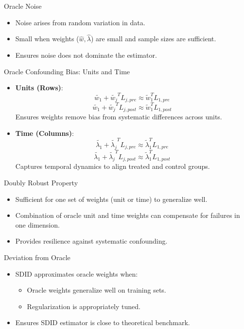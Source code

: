 \documentclass{beamer}
\begin{document}
\begin{frame}{Oracle Noise}
\begin{itemize}
\item Noise arises from random variation in data.
\item Small when weights (\(\hat{w}, \hat{\lambda}\)) are small and sample sizes are sufficient.
\item Ensures noise does not dominate the estimator.
\end{itemize}
\end{frame}

\begin{frame}{Oracle Confounding Bias: Units and Time}
\begin{itemize}
\item \textbf{Units (Rows)}:
    \[
    \widetilde{w_1} + \widetilde{w_{j}}^TL_{j,pre} \approx \widetilde{w}_1^TL_{1,pre}
    \]
    \[
    \widetilde{w_1} + \widetilde{w_{j}}^TL_{j,post} \approx \widetilde{w}_1^TL_{1,post}
    \]
    Ensures weights remove bias from systematic differences across units.
\item \textbf{Time (Columns)}:
    \[
    \widetilde{\lambda_1} + \widetilde{\lambda_{j}}^TL_{j,pre} \approx \widetilde{\lambda}_1^TL_{1,pre}
    \]
    \[
    \widetilde{\lambda_1} + \widetilde{\lambda_{j}}^TL_{j,post} \approx \widetilde{\lambda}_1^TL_{1,post}
    \]
    Captures temporal dynamics to align treated and control groups.
\end{itemize}
\end{frame}

\begin{frame}{Doubly Robust Property}
\begin{itemize}
\item Sufficient for one set of weights (unit or time) to generalize well.
\item Combination of oracle unit and time weights can compensate for failures in one dimension.
\item Provides resilience against systematic confounding.
\end{itemize}
\end{frame}

\begin{frame}{Deviation from Oracle}
\begin{itemize}
\item SDID approximates oracle weights when:
    \begin{itemize}
    \item Oracle weights generalize well on training sets.
    \item Regularization is appropriately tuned.
    \end{itemize}
\item Ensures SDID estimator is close to theoretical benchmark.
\end{itemize}
\end{frame}
\end{document}
